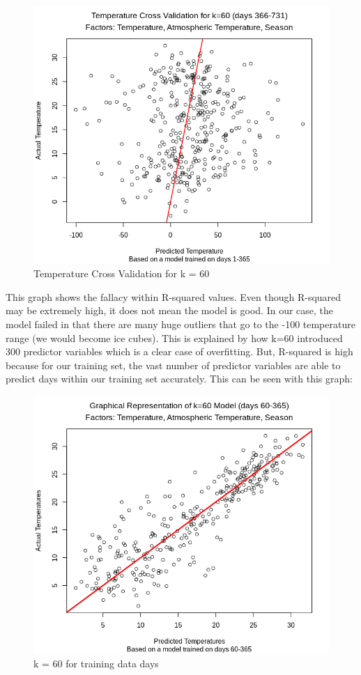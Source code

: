 \documentclass[12pt]{article}
\begin{document}
\begin{figure}[H]
	\centering
  	\includegraphics[width=150mm]{tempxvalidk=60.png}
 	\caption{Temperature Cross Validation for k = 60}
 	\label{fig:tempxvalidk=60}
\end{figure}

This graph shows the fallacy within R-squared values. Even though R-squared may be extremely high, it does not mean the model is good. In our case, the model failed in that there are many huge outliers that go to the -100 temperature range (we would become ice cubes). This is explained by how k=60 introduced 300 predictor variables which is a clear case of overfitting. But, R-squared is high because for our training set, the vast number of predictor variables are able to predict days within our training set accurately. This can be seen with this graph: 

\begin{figure}[H]
	\centering
  	\includegraphics[width=150mm]{k=60model.png}
 	\caption{k = 60 for training data days}
 	\label{fig:k=60model}
\end{figure}
\end{document}
